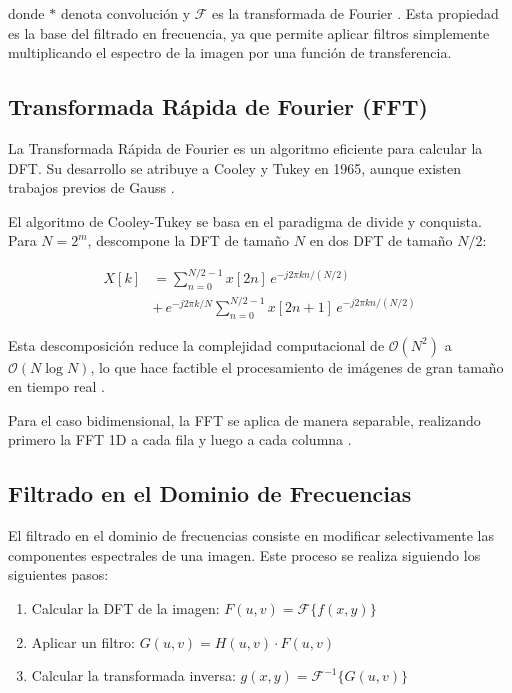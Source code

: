 \documentclass[conference]{IEEEtran}
\begin{document}
donde $*$ denota convolución y $\mathcal{F}$ es la transformada de Fourier \cite{gockenbach2010}. Esta propiedad es la base del filtrado en frecuencia, ya que permite aplicar filtros simplemente multiplicando el espectro de la imagen por una función de transferencia.

\subsection{Transformada Rápida de Fourier (FFT)}

La Transformada Rápida de Fourier es un algoritmo eficiente para calcular la DFT. Su desarrollo se atribuye a Cooley y Tukey en 1965, aunque existen trabajos previos de Gauss \cite{cooley1967}.

El algoritmo de Cooley-Tukey se basa en el paradigma de divide y conquista. Para $N = 2^m$, descompone la DFT de tamaño $N$ en dos DFT de tamaño $N/2$:

\begin{equation}
\begin{split}
X[k] &= \sum_{n=0}^{N/2-1} x[2n] \, e^{-j2\pi kn/(N/2)} \\ 
     &+ \, e^{-j2\pi k/N} \sum_{n=0}^{N/2-1} x[2n+1] \, e^{-j2\pi kn/(N/2)}
\end{split}
\label{eq:cooley}
\end{equation}

Esta descomposición reduce la complejidad computacional de $\mathcal{O}(N^2)$ a $\mathcal{O}(N \log N)$, lo que hace factible el procesamiento de imágenes de gran tamaño en tiempo real \cite{johnson2020}.

Para el caso bidimensional, la FFT se aplica de manera separable, realizando primero la FFT 1D a cada fila y luego a cada columna \cite{numpy2024}.

\subsection{Filtrado en el Dominio de Frecuencias}

El filtrado en el dominio de frecuencias consiste en modificar selectivamente las componentes espectrales de una imagen. Este proceso se realiza siguiendo los siguientes pasos:

\begin{enumerate}
    \item Calcular la DFT de la imagen: $F(u,v) = \mathcal{F}\{f(x,y)\}$
    \item Aplicar un filtro: $G(u,v) = H(u,v) \cdot F(u,v)$
    \item Calcular la transformada inversa: $g(x,y) = \mathcal{F}^{-1}\{G(u,v)\}$
\end{enumerate}
\end{document}
